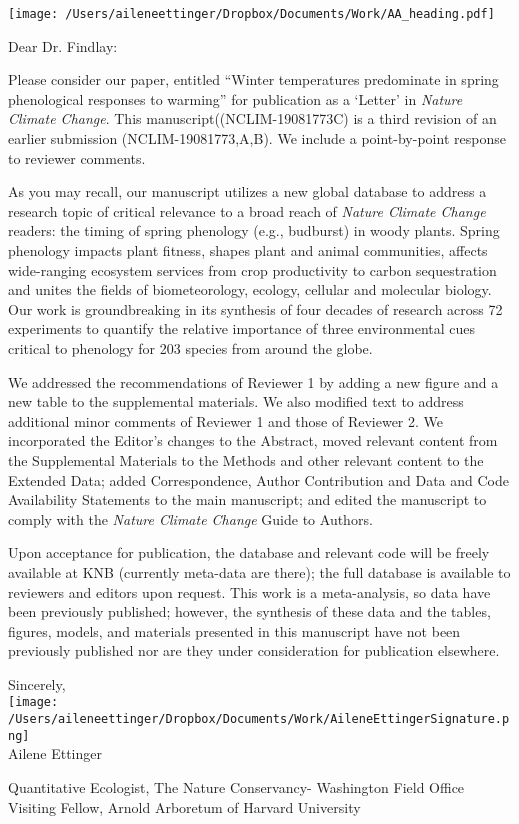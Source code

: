 \documentclass[11.5pt,a4paper]{letter}
\begin{document}
\begin{letter}{}
\texttt{[image: /Users/aileneettinger/Dropbox/Documents/Work/AA\_heading.pdf]}

\opening{Dear Dr. Findlay:}
Please consider our paper, entitled ``Winter temperatures predominate in spring phenological responses to warming'' for publication as a `Letter' in \emph{Nature Climate Change}. This manuscript((NCLIM-19081773C) is a third revision of an earlier submission (NCLIM-19081773,A,B). We include a point-by-point response to reviewer comments. 

\par As you may recall, our manuscript utilizes a new global database to address a research topic of critical relevance to a broad reach of \emph{Nature Climate Change} readers:  the timing of spring phenology (e.g., budburst) in woody plants. Spring phenology impacts plant fitness, shapes plant and animal communities, affects wide-ranging ecosystem services from crop productivity to carbon sequestration and unites the fields of biometeorology, ecology, cellular and molecular biology. Our work is groundbreaking in its synthesis of four decades of research across 72 experiments to quantify the relative importance of three environmental cues critical to phenology for 203 species from around the globe. 

\par We addressed the recommendations of Reviewer 1 by adding a new figure and a new table to the supplemental materials. We also modified text to address additional minor comments of Reviewer 1 and those of Reviewer 2. We incorporated the Editor's changes to the Abstract, moved relevant content from the Supplemental Materials to the Methods and other relevant content to the Extended Data; added Correspondence, Author Contribution and Data and Code Availability Statements to the main manuscript; and edited the manuscript to comply with the \emph{Nature Climate Change} Guide to Authors.

\par Upon acceptance for publication, the database and relevant code will be freely available at KNB (currently meta-data are there); the full database is available to reviewers and editors upon request. This work is a meta-analysis, so data have been previously published; however, the synthesis of these data and the tables, figures, models, and materials presented in this manuscript have not been previously published nor are they under consideration for publication elsewhere.

Sincerely,\\

\texttt{[image: /Users/aileneettinger/Dropbox/Documents/Work/AileneEttingerSignature.png]} \\
Ailene Ettinger\\
\begin{footnotesize}
Quantitative Ecologist, The Nature Conservancy- Washington Field Office\\
Visiting Fellow, Arnold Arboretum of Harvard University 
\end{footnotesize}

\end{letter}
\end{document}
